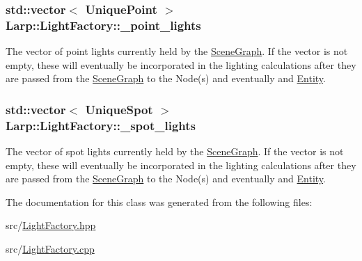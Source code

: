\subsubsection[{\texorpdfstring{\+\_\+point\+\_\+lights}{_point_lights}}]{\setlength{\rightskip}{0pt plus 5cm}std\+::vector$<$ {\bf Unique\+Point} $>$ Larp\+::\+Light\+Factory\+::\+\_\+point\+\_\+lights\hspace{0.3cm}{\ttfamily [static]}}\hypertarget{classLarp_1_1LightFactory_a753c553436a0a8418f9bdc8a96a5ec77}{}\label{classLarp_1_1LightFactory_a753c553436a0a8418f9bdc8a96a5ec77}
The vector of point lights currently held by the \hyperlink{classLarp_1_1SceneGraph}{Scene\+Graph}. If the vector is not empty, these will eventually be incorporated in the lighting calculations after they are passed from the \hyperlink{classLarp_1_1SceneGraph}{Scene\+Graph} to the Node(s) and eventually and \hyperlink{classLarp_1_1Entity}{Entity}. 
\subsubsection[{\texorpdfstring{\+\_\+spot\+\_\+lights}{_spot_lights}}]{\setlength{\rightskip}{0pt plus 5cm}std\+::vector$<$ {\bf Unique\+Spot} $>$ Larp\+::\+Light\+Factory\+::\+\_\+spot\+\_\+lights\hspace{0.3cm}{\ttfamily [static]}}\hypertarget{classLarp_1_1LightFactory_a137f1ae8f92113b5bf59601dc47db5c9}{}\label{classLarp_1_1LightFactory_a137f1ae8f92113b5bf59601dc47db5c9}
The vector of spot lights currently held by the \hyperlink{classLarp_1_1SceneGraph}{Scene\+Graph}. If the vector is not empty, these will eventually be incorporated in the lighting calculations after they are passed from the \hyperlink{classLarp_1_1SceneGraph}{Scene\+Graph} to the Node(s) and eventually and \hyperlink{classLarp_1_1Entity}{Entity}. 

The documentation for this class was generated from the following files\+:\begin{DoxyCompactItemize}
\item 
src/\hyperlink{LightFactory_8hpp}{Light\+Factory.\+hpp}\item 
src/\hyperlink{LightFactory_8cpp}{Light\+Factory.\+cpp}\end{DoxyCompactItemize}
